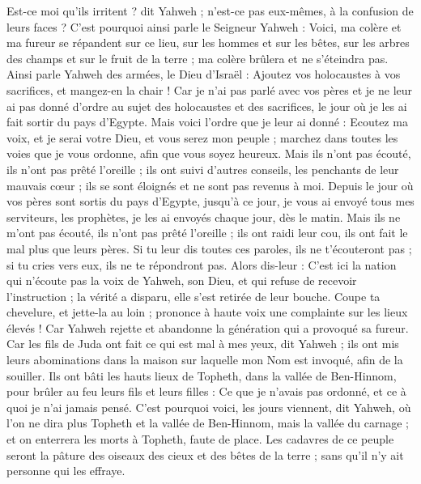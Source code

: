\begin{multicols}{2}
Est-ce moi qu’ils irritent ? dit Yahweh ; n'est-ce pas eux-mêmes, à la confusion de leurs faces ?
C'est pourquoi ainsi parle le Seigneur Yahweh : Voici, ma colère et ma fureur se répandent sur ce lieu, sur les hommes et sur les bêtes, sur les arbres des champs et sur le fruit de la terre ; ma colère brûlera et ne s'éteindra pas.
Ainsi parle Yahweh des armées, le Dieu d'Israël : Ajoutez vos holocaustes à vos sacrifices, et mangez-en la chair !
Car je n'ai pas parlé avec vos pères et je ne leur ai pas donné d’ordre au sujet des holocaustes et des sacrifices, le jour où je les ai fait sortir du pays d'Egypte.
Mais voici l’ordre que je leur ai donné : Ecoutez ma voix, et je serai votre Dieu, et vous serez mon peuple ; marchez dans toutes les voies que je vous ordonne, afin que vous soyez heureux.
Mais ils n'ont pas écouté, ils n'ont pas prêté l’oreille ; ils ont suivi d'autres conseils, les penchants de leur mauvais cœur ; ils se sont éloignés et ne sont pas revenus à moi.
Depuis le jour où vos pères sont sortis du pays d'Egypte, jusqu’à ce jour, je vous ai envoyé tous mes serviteurs, les prophètes, je les ai envoyés chaque jour, dès le matin.
Mais ils ne m'ont pas écouté, ils n'ont pas prêté l’oreille ; ils ont raidi leur cou, ils ont fait le mal plus que leurs pères.
Si tu leur dis toutes ces paroles, ils ne t'écouteront pas ; si tu cries vers eux, ils ne te répondront pas.
Alors dis-leur : C'est ici la nation qui n’écoute pas la voix de Yahweh, son Dieu, et qui refuse de recevoir l’instruction ; la vérité a disparu, elle s’est retirée de leur bouche.
Coupe ta chevelure, et jette-la au loin ; prononce à haute voix une complainte sur les lieux élevés ! Car Yahweh rejette et abandonne la génération qui a provoqué sa fureur.
Car les fils de Juda ont fait ce qui est mal à mes yeux, dit Yahweh ; ils ont mis leurs abominations dans la maison sur laquelle mon Nom est invoqué, afin de la souiller.
Ils ont bâti les hauts lieux de Topheth, dans la vallée de Ben-Hinnom, pour brûler au feu leurs fils et leurs filles : Ce que je n'avais pas ordonné, et ce à quoi je n’ai jamais pensé.
C'est pourquoi voici, les jours viennent, dit Yahweh, où l’on ne dira plus Topheth et la vallée de Ben-Hinnom, mais la vallée du carnage ; et on enterrera les morts à Topheth, faute de place.
Les cadavres de ce peuple seront la pâture des oiseaux des cieux et des bêtes de la terre ; sans qu'il n’y ait personne qui les effraye.

\end{multicols}

